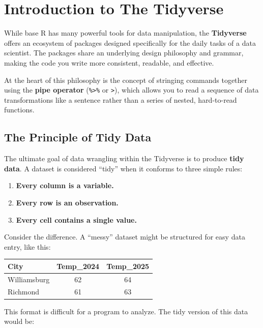\documentclass[
  11pt,
]{article}
\providecommand{\tightlist}{%
  \setlength{\itemsep}{0pt}\setlength{\parskip}{0pt}}
\begin{document}
\section{Introduction to The
Tidyverse}\label{introduction-to-the-tidyverse}

While base R has many powerful tools for data manipulation, the
\textbf{Tidyverse} offers an ecosystem of packages designed specifically
for the daily tasks of a data scientist. The packages share an
underlying design philosophy and grammar, making the code you write more
consistent, readable, and effective.

At the heart of this philosophy is the concept of stringing commands
together using the \textbf{pipe operator} (\texttt{\%\textgreater{}\%}
or \texttt{\textbar{}\textgreater{}}), which allows you to read a
sequence of data transformations like a sentence rather than a series of
nested, hard-to-read functions.

\subsection{The Principle of Tidy
Data}\label{the-principle-of-tidy-data}

The ultimate goal of data wrangling within the Tidyverse is to produce
\textbf{tidy data}. A dataset is considered ``tidy'' when it conforms to
three simple rules:

\begin{enumerate}
\def\labelenumi{\arabic{enumi}.}
\tightlist
\item
  \textbf{Every column is a variable.}
\item
  \textbf{Every row is an observation.}
\item
  \textbf{Every cell contains a single value.}
\end{enumerate}

Consider the difference. A ``messy'' dataset might be structured for
easy data entry, like this:

\begin{longtable}[]{@{}lcc@{}}
\toprule\noalign{}
City & Temp\_2024 & Temp\_2025 \\
\midrule\noalign{}
\endhead
\bottomrule\noalign{}
\endlastfoot
Williamsburg & 62 & 64 \\
Richmond & 61 & 63 \\
\end{longtable}

This format is difficult for a program to analyze. The tidy version of
this data would be:
\end{document}
